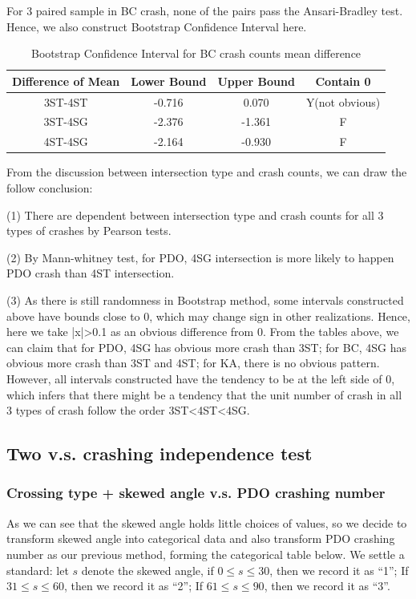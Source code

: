 \documentclass[11pt]{scrartcl} %
\begin{document}
For 3 paired sample in BC crash, none of the pairs pass the Ansari-Bradley test. Hence, we also construct Bootstrap Confidence Interval here.

\begin{table}[H]
\caption{Bootstrap Confidence Interval for BC crash counts mean difference}
\centering
\begin{tabular}{|c|c|c|c|}
\hline
Difference of Mean  & Lower Bound & Upper Bound & Contain 0 \\
\hline
3ST-4ST & -0.716 & 0.070 & Y(not obvious) \\
\hline
3ST-4SG   & -2.376  & -1.361  & F \\
\hline
4ST-4SG   & -2.164  & -0.930 & F \\
\hline
\end{tabular}
\end{table}

From the discussion between intersection type and crash counts, we can draw the follow conclusion:

(1) There are dependent between intersection type and crash counts for all 3 types of crashes by Pearson tests.

(2) By Mann-whitney test, for PDO, 4SG intersection is more likely to happen PDO crash than 4ST intersection.

(3) As there is still randomness in Bootstrap method, some intervals constructed above have bounds close to 0, which may change sign in other realizations. Hence, here we take |x|>0.1 as an obvious difference from 0. From the tables above, we can claim that for PDO, 4SG has obvious more crash than 3ST; for BC, 4SG has obvious more crash than 3ST and 4ST; for KA, there is no obvious pattern. However, all intervals constructed have the tendency to be at the left side of 0, which infers that there might be a tendency that the unit number of crash in all 3 types of crash follow the order 3ST<4ST<4SG.

\subsection{Two v.s. crashing independence test}

\subsubsection{Crossing type + skewed angle v.s. PDO crashing number}

As we can see that the skewed angle holds little choices of values, so we decide to transform skewed angle into categorical data and also transform PDO crashing number as our previous method, forming the categorical table below. We settle a standard: let $s$ denote the skewed angle, if $0 \le s \le 30$, then we record it as ``1''; If $31 \le s \le 60$, then we record it as ``2''; If $61 \le s \le 90$, then we record it as ``3''.
\end{document}
